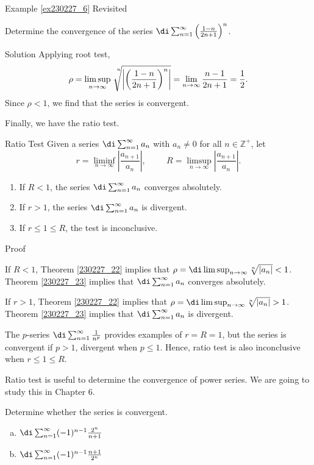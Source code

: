\begin{example}{\linkt Example \ref{ex230227_6} Revisited}
\begin{example}[label=ex230227_13]{}
\begin{example}{}
Determine the convergence of the  series 
$\di\sum_{n=1}^{\infty}\left(\frac{1-n}{2n+1}\right)^n$.
 
\end{example}
\begin{solution}{Solution}
Applying root test, 
\[\rho=\limsup_{n\to\infty}\sqrt[\leftroot{-5}\uproot{15} n]{\left|\left(\frac{1-n}{2n+1}\right)^n\right|}=\lim_{n\to\infty}\frac{n-1}{2n+1}=\frac{1}{2}.\]
Since $\rho<1$, we find that the series   is convergent.
\end{solution}

Finally, we have the ratio test.
\begin{theorem}[label=230305_4]{Ratio Test}
Given a series $\di\sum_{n=1}^{\infty}a_n$ with $a_n\neq 0$ for all $n\in\mathbb{Z}^+$, let
\[r=\liminf_{n\to\infty}\left|\frac{a_{n+1}}{a_n}\right|,\hspace{1cm}R=\limsup_{n\to\infty}\left|\frac{a_{n+1}}{a_n}\right|.\]
\begin{enumerate}[1.]
\item
If $R<1$, the series $\di\sum_{n=1}^{\infty}a_n$ converges absolutely.
\item If $r>1$,  the series $\di\sum_{n=1}^{\infty}a_n$ is divergent.
\item If $r\leq 1\leq R$, the test is inconclusive.
\end{enumerate}
\end{theorem}\begin{myproof}{Proof}
 
If $R<1$, Theorem \ref{230227_22} implies that $\rho=\di\limsup_{n\to\infty}\sqrt[n]{|a_n|}<1$. Theorem \ref{230227_23} implies that $\di\sum_{n=1}^{\infty}a_n$ converges absolutely.
 
If $r>1$, Theorem \ref{230227_22} implies that $\rho=\di\limsup_{n\to\infty}\sqrt[n]{|a_n|}>1$. Theorem \ref{230227_23} implies that $\di\sum_{n=1}^{\infty}a_n$  is divergent.
 
The $p$-series $\di\sum_{n=1}^{\infty}\frac{1}{n^p}$ provides examples of $r=R=1$, but the series is convergent if $p>1$, divergent when $p\leq1 $. Hence, ratio test is also inconclusive when $r\leq 1\leq R$.

 \end{myproof}
Ratio test is useful to determine the convergence of power series. We are going to study this in Chapter 6.

\begin{example}
{}
Determine whether the series is convergent.
\begin{enumerate}[(a)]
\item $\di \sum_{n=1}^{\infty}(-1)^{n-1}\frac{2^n}{n+1}$
\item  $\di \sum_{n=1}^{\infty}(-1)^{n-1}\frac{n+1}{2^n}$


\end{enumerate}
\end{example}
\end{example}
\end{example}
